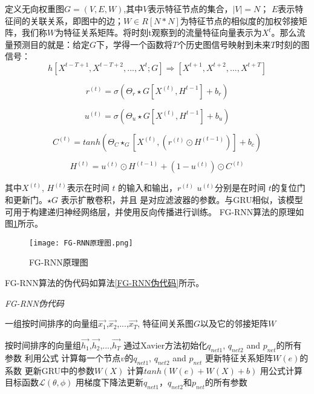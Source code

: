定义无向权重图$G=(V,E,W)$,其中$V$表示特征节点的集合，$|V|=N$； $E$表示特征间的关联关系，即图中的边；$W \in R[N*N]$为特征节点的相似度的加权邻接矩阵，我们称$W$为特征关系矩阵。将时刻t观察到的流量特征向量表示为$X^t$。那么流量预测目的就是：给定$G$下，学得一个函数将$T$个历史图信号映射到未来$T$时刻的图信号：
\begin{equation}
    h[X^{t-T+1}, X^{t-T+2},...,X^{t}; G] \Rightarrow [X^{t+1}, X^{t+2}, ..., X^{t+T}]
\end{equation}

\begin{equation}
    r^{(t)} = \sigma(\Theta_r\star G[X^{(t)},H^{t-1}] + b_r)
\end{equation}

\begin{equation}
    u^{(t)} = \sigma(\Theta_u\star G[X^{(t)},H^{t-1}] + b_u)
\end{equation}

\begin{equation}
    C^{(t)} = tanh(\Theta_C\star_G[X^{(t)},(r^{(t)}\odot H^{(t-1)})] + b_c)
\end{equation}

\begin{equation}
    H^{(t)} = u^{(t)}\odot H^{(t-1)} + (1 - u^{(t)}) \odot C^{(t)}
\end{equation}

其中$X^{(t)}$, $H^{(t)}$表示在时间 $t$ 的输入和输出，$r^{(t)}$ $u^{(t)}$分别是在时间 $t$的复位门和更新门。$\star G$  表示扩散卷积，并且  是对应滤波器的参数。与GRU相似，该模型可用于构建递归神经网络层，并使用反向传播进行训练。
FG-RNN算法的原理如图\ref{fig:FG-RNN原理图}所示。
\begin{figure}[H]
  \centering
  \texttt{[image: FG-RNN原理图.png]}
  \caption{FG-RNN原理图}
  \label{fig:FG-RNN原理图}
\end{figure}
FG-RNN算法的伪代码如算法\ref{FG-RNN伪代码}所示。
\begin{algorithm}[!h]
  \caption{\emph{FG-RNN伪代码}}
  \label{FG-RNN伪代码}
  \begin{algorithmic}[1]
    \Require
      一组按时间排序的向量组$\vec{x_1}$,$\vec{x_2}$,...,$\vec{x_T}$, 特征间关系图$G$以及它的邻接矩阵$W$

    \Ensure
      按时间排序的向量组$\vec{h_1}$,$\vec{h_2}$,...,$\vec{h_T}$
    \State 通过Xavier方法初始化$q_{net1}$, $q_{net2}$ and $p_{net}$的所有参数
        \State 利用公式 计算每一个节点$v$的$q_{net1}$, $q_{net2}$ and $p_{net}$
        \State 更新特征关系矩阵$W(e)$的系数
        \State 更新GRU中的参数$W(X)$
        \State 计算$tanh(W(e) + W(X) + b)$        
        \EndFor
        \State 用公式计算目标函数$\mathcal{L}(\theta, \phi)$ 
        \State 用梯度下降法更新$q_{net1}$，$q_{net2}$和$p_{net}$的所有参数
    \EndWhile
  \end{algorithmic}
\end{algorithm}

